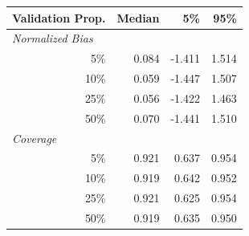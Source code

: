 \begin{tabular}[t]{r|rrr}
\toprule
Validation Prop. & Median & 5\% & 95\% \\
\midrule
\multicolumn{1}{l|}{\textit{Normalized Bias}} \\
5\% & 0.084 & -1.411 & 1.514 \\
10\% & 0.059 & -1.447 & 1.507 \\
25\% & 0.056 & -1.422 & 1.463 \\
50\% & 0.070 & -1.441 & 1.510 \\
\midrule 
\multicolumn{1}{l|}{\textit{Coverage}} \\
5\% & 0.921 & 0.637 & 0.954 \\
10\% & 0.919 & 0.642 & 0.952 \\
25\% & 0.921 & 0.625 & 0.954 \\
50\% & 0.919 & 0.635 & 0.950\\
\bottomrule
\end{tabular}